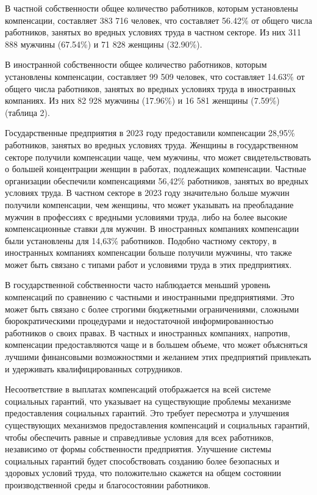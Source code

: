 \begin{multicols}{2}
В частной собственности общее количество работников, которым установлены
компенсации, составляет 383 716 человек, что составляет 56.42\% от
общего числа работников, занятых во вредных условиях труда в частном
секторе. Из них 311 888 мужчины (67.54\%) и 71 828 женщины (32.90\%).

В иностранной собственности общее количество работников, которым
установлены компенсации, составляет 99 509 человек, что составляет
14.63\% от общего числа работников, занятых во вредных условиях труда в
иностранных компаниях. Из них 82 928 мужчины (17.96\%) и 16 581 женщины
(7.59\%) (таблица 2).

Государственные предприятия в 2023 году предоставили компенсации 28,95\%
работников, занятых во вредных условиях труда. Женщины в государственном
секторе получили компенсации чаще, чем мужчины, что может
свидетельствовать о большей концентрации женщин в работах, подлежащих
компенсации. Частные организации обеспечили компенсациями 56,42\%
работников, занятых во вредных условиях труда. В частном секторе в 2023
году значительно больше мужчин получили компенсации, чем женщины, что
может указывать на преобладание мужчин в профессиях с вредными условиями
труда, либо на более высокие компенсационные ставки для мужчин. В
иностранных компаниях компенсации были установлены для 14,63\%
работников. Подобно частному сектору, в иностранных компаниях
компенсации больше получили мужчины, что также может быть связано с
типами работ и условиями труда в этих предприятиях.

В государственной собственности часто наблюдается меньший уровень
компенсаций по сравнению с частными и иностранными предприятиями. Это
может быть связано с более строгими бюджетными ограничениями, сложными
бюрократическими процедурами и недостаточной информированностью
работников о своих правах. В частных и иностранных компаниях, напротив,
компенсации предоставляются чаще и в большем объеме, что может
объясняться лучшими финансовыми возможностями и желанием этих
предприятий привлекать и удерживать квалифицированных сотрудников.

Несоответствие в выплатах компенсаций отображается на всей системе
социальных гарантий, что указывает на существующие проблемы механизме
предоставления социальных гарантий. Это требует пересмотра и улучшения
существующих механизмов предоставления компенсаций и социальных
гарантий, чтобы обеспечить равные и справедливые условия для всех
работников, независимо от формы собственности предприятия. Улучшение
системы социальных гарантий будет способствовать созданию более
безопасных и здоровых условий труда, что положительно скажется на общем
состоянии производственной среды и благосостоянии работников.


\end{multicols}
